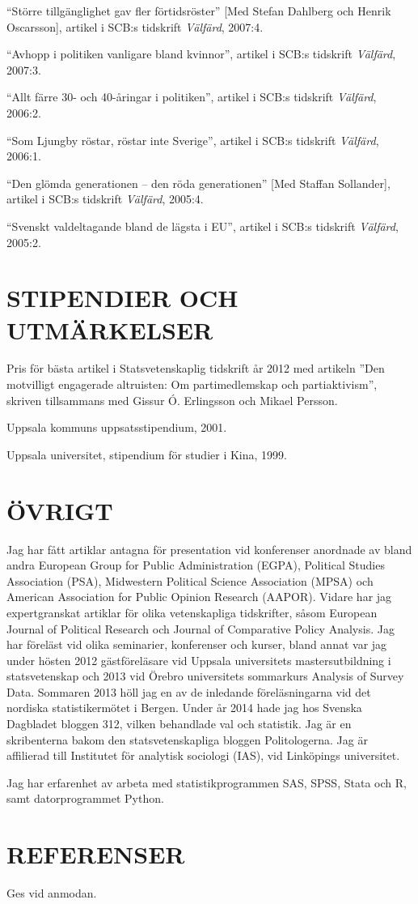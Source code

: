 \documentclass[11pt,]{article}
\begin{document}
``Större tillgänglighet gav fler förtidsröster'' {[}Med Stefan Dahlberg
och Henrik Oscarsson{]}, artikel i SCB:s tidskrift \emph{Välfärd},
2007:4.

``Avhopp i politiken vanligare bland kvinnor'', artikel i SCB:s
tidskrift \emph{Välfärd}, 2007:3.

``Allt färre 30- och 40-åringar i politiken'', artikel i SCB:s tidskrift
\emph{Välfärd}, 2006:2.

``Som Ljungby röstar, röstar inte Sverige'', artikel i SCB:s tidskrift
\emph{Välfärd}, 2006:1.

``Den glömda generationen -- den röda generationen'' {[}Med Staffan
Sollander{]}, artikel i SCB:s tidskrift \emph{Välfärd}, 2005:4.

``Svenskt valdeltagande bland de lägsta i EU'', artikel i SCB:s
tidskrift \emph{Välfärd}, 2005:2.

\hypertarget{stipendier-och-utmarkelser}{%
\section{STIPENDIER OCH UTMÄRKELSER}\label{stipendier-och-utmarkelser}}

Pris för bästa artikel i Statsvetenskaplig tidskrift år 2012 med
artikeln ''Den motvilligt engagerade altruisten: Om partimedlemskap och
partiaktivism'', skriven tillsammans med Gissur Ó. Erlingsson och Mikael
Persson.

Uppsala kommuns uppsatsstipendium, 2001.

Uppsala universitet, stipendium för studier i Kina, 1999.

\hypertarget{ovrigt}{%
\section{ÖVRIGT}\label{ovrigt}}

Jag har fått artiklar antagna för presentation vid konferenser anordnade
av bland andra European Group for Public Administration (EGPA),
Political Studies Association (PSA), Midwestern Political Science
Association (MPSA) och American Association for Public Opinion Research
(AAPOR). Vidare har jag expertgranskat artiklar för olika vetenskapliga
tidskrifter, såsom European Journal of Political Research och Journal of
Comparative Policy Analysis. Jag har föreläst vid olika seminarier,
konferenser och kurser, bland annat var jag under hösten 2012
gästföreläsare vid Uppsala universitets mastersutbildning i
statsvetenskap och 2013 vid Örebro universitets sommarkurs Analysis of
Survey Data. Sommaren 2013 höll jag en av de inledande föreläsningarna
vid det nordiska statistikermötet i Bergen. Under år 2014 hade jag hos
Svenska Dagbladet bloggen 312, vilken behandlade val och statistik. Jag
är en skribenterna bakom den statsvetenskapliga bloggen Politologerna.
Jag är affilierad till Institutet för analytisk sociologi (IAS), vid
Linköpings universitet.

Jag har erfarenhet av arbeta med statistikprogrammen SAS, SPSS, Stata
och R, samt datorprogrammet Python.

\hypertarget{referenser}{%
\section{REFERENSER}\label{referenser}}

Ges vid anmodan.
\end{document}
